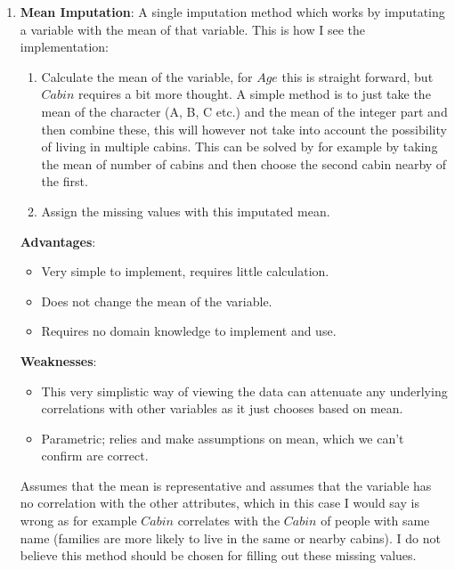 \documentclass[11pt, english]{../Template/NTNUoving}
\begin{document}
\begin{oppgave}
\begin{enumerate}
        \item \textbf{Mean Imputation}\cite{mean}: A single imputation method which works by imputating a variable with the mean of that variable.
        This is how I see the implementation:
        \begin{enumerate}[label=\arabic*]
            \item Calculate the mean of the variable, for $Age$ this is straight forward, but $Cabin$ requires a bit more thought. A simple method is to just
            take the mean of the character (A, B, C etc.) and the mean of the integer part and then combine these, this will however not take into account the possibility of living in multiple cabins.
            This can be solved by for example by taking the mean of number of cabins and then choose the second cabin nearby of the first.
            \item Assign the missing values with this imputated mean.
        \end{enumerate}
        \textbf{Advantages}:
        \begin{itemize}
            \item Very simple to implement, requires little calculation.
            \item Does not change the mean of the variable.
            \item Requires no domain knowledge to implement and use.
        \end{itemize}
        \textbf{Weaknesses}:
        \begin{itemize}
            \item This very simplistic way of viewing the data can attenuate any underlying correlations with other variables as it just chooses based on mean.
            \item Parametric; relies and make assumptions on mean, which we can't confirm are correct.
        \end{itemize}
        Assumes that the mean is representative and assumes that the variable has no correlation with the other attributes, which in this case I would say is wrong
        as for example $Cabin$ correlates with the $Cabin$ of people with same name (families are more likely to live in the same or nearby cabins).
        I do not believe this method should be chosen for filling out these missing values.


\end{enumerate}
\end{oppgave}
\end{document}
